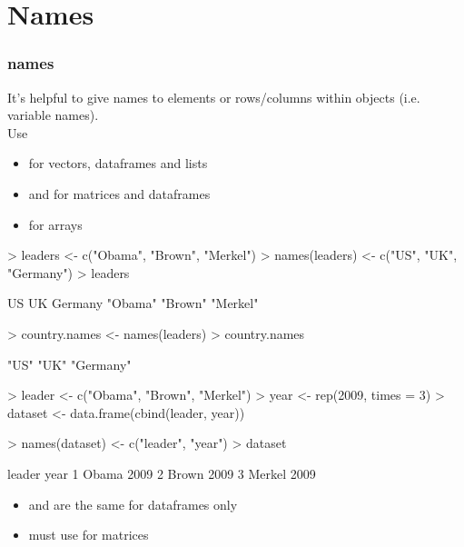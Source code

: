 \documentclass[handout]{beamer}
\newcommand{\red}{\color{red}}
\newcommand{\black}{\color{black}}
\begin{document}
\section{Names}
\begin{frame}
\frametitle{names}
It's helpful to give names to elements or rows/columns within objects (i.e. variable names).\\
\pause
\bigskip
Use
\begin{itemize}
\item \red{\tt names()} \black for vectors, dataframes and lists
\pause
\item \red{\tt rownames()} \black and \red{\tt colnames()}\black for matrices and dataframes
\pause
\item \red{\tt dimnames()} \black for arrays
\end{itemize}
\end{frame}

\begin{frame}[fragile]
\red
\begin{Schunk}
\begin{Sinput}
> leaders <- c("Obama", "Brown", "Merkel")
> names(leaders) <- c("US", "UK", "Germany")
> leaders
\end{Sinput}
\begin{Soutput}
      US       UK  Germany 
 "Obama"  "Brown" "Merkel" 
\end{Soutput}
\end{Schunk}
\pause
\bigskip
\begin{Schunk}
\begin{Sinput}
> country.names <- names(leaders)
> country.names
\end{Sinput}
\begin{Soutput}
[1] "US"      "UK"      "Germany"
\end{Soutput}
\end{Schunk}
\end{frame}

\begin{frame}[fragile]
\red
\begin{Schunk}
\begin{Sinput}
> leader <- c("Obama", "Brown", "Merkel")
> year <- rep(2009, times = 3)
> dataset <- data.frame(cbind(leader, year))
\end{Sinput}
\end{Schunk}
\pause
\begin{Schunk}
\begin{Sinput}
> names(dataset) <- c("leader", "year")
> dataset
\end{Sinput}
\begin{Soutput}
  leader year
1  Obama 2009
2  Brown 2009
3 Merkel 2009
\end{Soutput}
\end{Schunk}
\pause
\bigskip
\black
\begin{itemize}
\item \red{\tt names()} \black and \red{\tt colnames()} \black are the same for dataframes only
\pause
\item must use \red{\tt colnames()}\black for matrices
\end{itemize}
\end{frame}
\end{document}
